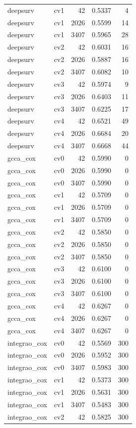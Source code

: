 \documentclass[10pt]{article}
\begin{document}
\begin{longtable}{llrrr}
deepsurv & cv1 & 42 & 0.5337 & 4\\
deepsurv & cv1 & 2026 & 0.5599 & 14\\
deepsurv & cv1 & 3407 & 0.5965 & 28\\
deepsurv & cv2 & 42 & 0.6031 & 16\\
deepsurv & cv2 & 2026 & 0.5887 & 16\\
deepsurv & cv2 & 3407 & 0.6082 & 10\\
deepsurv & cv3 & 42 & 0.5974 & 9\\
deepsurv & cv3 & 2026 & 0.6403 & 11\\
deepsurv & cv3 & 3407 & 0.6225 & 17\\
deepsurv & cv4 & 42 & 0.6521 & 49\\
deepsurv & cv4 & 2026 & 0.6684 & 20\\
deepsurv & cv4 & 3407 & 0.6668 & 44\\
gcca\_cox & cv0 & 42 & 0.5990 & 0\\
gcca\_cox & cv0 & 2026 & 0.5990 & 0\\
gcca\_cox & cv0 & 3407 & 0.5990 & 0\\
gcca\_cox & cv1 & 42 & 0.5709 & 0\\
gcca\_cox & cv1 & 2026 & 0.5709 & 0\\
gcca\_cox & cv1 & 3407 & 0.5709 & 0\\
gcca\_cox & cv2 & 42 & 0.5850 & 0\\
gcca\_cox & cv2 & 2026 & 0.5850 & 0\\
gcca\_cox & cv2 & 3407 & 0.5850 & 0\\
gcca\_cox & cv3 & 42 & 0.6100 & 0\\
gcca\_cox & cv3 & 2026 & 0.6100 & 0\\
gcca\_cox & cv3 & 3407 & 0.6100 & 0\\
gcca\_cox & cv4 & 42 & 0.6267 & 0\\
gcca\_cox & cv4 & 2026 & 0.6267 & 0\\
gcca\_cox & cv4 & 3407 & 0.6267 & 0\\
integrao\_cox & cv0 & 42 & 0.5569 & 300\\
integrao\_cox & cv0 & 2026 & 0.5952 & 300\\
integrao\_cox & cv0 & 3407 & 0.5983 & 300\\
integrao\_cox & cv1 & 42 & 0.5373 & 300\\
integrao\_cox & cv1 & 2026 & 0.5631 & 300\\
integrao\_cox & cv1 & 3407 & 0.5483 & 300\\
integrao\_cox & cv2 & 42 & 0.5825 & 300\\

\end{longtable}
\end{document}
